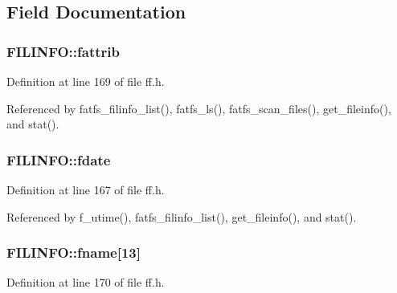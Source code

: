 \subsection{Field Documentation}
\subsubsection[{\texorpdfstring{fattrib}{fattrib}}]{ F\+I\+L\+I\+N\+F\+O\+::fattrib}\hypertarget{structFILINFO_a838d542585831b085537b363f18205c0}{}\label{structFILINFO_a838d542585831b085537b363f18205c0}


Definition at line 169 of file ff.\+h.



Referenced by fatfs\+\_\+filinfo\+\_\+list(), fatfs\+\_\+ls(), fatfs\+\_\+scan\+\_\+files(), get\+\_\+fileinfo(), and stat().

\subsubsection[{\texorpdfstring{fdate}{fdate}}]{ F\+I\+L\+I\+N\+F\+O\+::fdate}\hypertarget{structFILINFO_a7c01c48a15b1b49da459924437b0bd52}{}\label{structFILINFO_a7c01c48a15b1b49da459924437b0bd52}


Definition at line 167 of file ff.\+h.



Referenced by f\+\_\+utime(), fatfs\+\_\+filinfo\+\_\+list(), get\+\_\+fileinfo(), and stat().

\subsubsection[{\texorpdfstring{fname}{fname}}]{ F\+I\+L\+I\+N\+F\+O\+::fname\mbox{[}13\mbox{]}}\hypertarget{structFILINFO_abd852510f2f79b4ec773156d8942dc7c}{}\label{structFILINFO_abd852510f2f79b4ec773156d8942dc7c}


Definition at line 170 of file ff.\+h.



